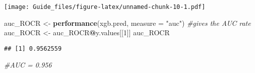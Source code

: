 \documentclass[11pt,]{article}
\newenvironment{Shaded}{\begin{snugshade}}{\end{snugshade}}
\newcommand{\KeywordTok}[1]{\textcolor[rgb]{0.13,0.29,0.53}{\textbf{#1}}}
\newcommand{\DataTypeTok}[1]{\textcolor[rgb]{0.13,0.29,0.53}{#1}}
\newcommand{\DecValTok}[1]{\textcolor[rgb]{0.00,0.00,0.81}{#1}}
\newcommand{\StringTok}[1]{\textcolor[rgb]{0.31,0.60,0.02}{#1}}
\newcommand{\CommentTok}[1]{\textcolor[rgb]{0.56,0.35,0.01}{\textit{#1}}}
\newcommand{\OperatorTok}[1]{\textcolor[rgb]{0.81,0.36,0.00}{\textbf{#1}}}
\newcommand{\NormalTok}[1]{#1}
\begin{document}
\texttt{[image: Guide\_files/figure-latex/unnamed-chunk-10-1.pdf]}

\begin{Shaded}
\begin{Highlighting}[]
\NormalTok{auc_ROCR <-}\StringTok{ }\KeywordTok{performance}\NormalTok{(xgb.pred, }\DataTypeTok{measure =} \StringTok{"auc"}\NormalTok{) }\CommentTok{#gives the AUC rate}
\NormalTok{auc_ROCR <-}\StringTok{ }\NormalTok{auc_ROCR}\OperatorTok{@}\NormalTok{y.values[[}\DecValTok{1}\NormalTok{]] }
\NormalTok{auc_ROCR }
\end{Highlighting}
\end{Shaded}

\begin{verbatim}
## [1] 0.9562559
\end{verbatim}

\begin{Shaded}
\begin{Highlighting}[]
\CommentTok{#AUC = 0.956}
\end{Highlighting}
\end{Shaded}




\newpage
\singlespacing 
\end{document}
